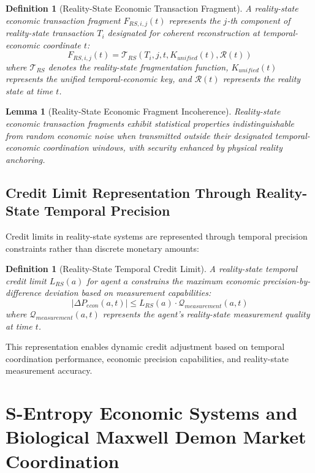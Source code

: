 \documentclass[12pt,a4paper]{article}
\newtheorem{lemma}[theorem]{Lemma}
\newtheorem{definition}[theorem]{Definition}
\begin{document}
\begin{definition}[Reality-State Economic Transaction Fragment]
A reality-state economic transaction fragment $F_{RS,i,j}(t)$ represents the $j$-th component of reality-state transaction $T_i$ designated for coherent reconstruction at temporal-economic coordinate $t$:
\begin{equation}
F_{RS,i,j}(t) = \mathcal{T}_{RS}(T_i, j, t, K_{unified}(t), \mathcal{R}(t))
\end{equation}
where $\mathcal{T}_{RS}$ denotes the reality-state fragmentation function, $K_{unified}(t)$ represents the unified temporal-economic key, and $\mathcal{R}(t)$ represents the reality state at time $t$.
\end{definition}

\begin{lemma}[Reality-State Economic Fragment Incoherence]
Reality-state economic transaction fragments exhibit statistical properties indistinguishable from random economic noise when transmitted outside their designated temporal-economic coordination windows, with security enhanced by physical reality anchoring.
\end{lemma}

\subsection{Credit Limit Representation Through Reality-State Temporal Precision}

Credit limits in reality-state systems are represented through temporal precision constraints rather than discrete monetary amounts:

\begin{definition}[Reality-State Temporal Credit Limit]
A reality-state temporal credit limit $L_{RS}(a)$ for agent $a$ constrains the maximum economic precision-by-difference deviation based on measurement capabilities:
\begin{equation}
|\Delta P_{econ}(a,t)| \leq L_{RS}(a) \cdot \mathcal{Q}_{measurement}(a,t)
\end{equation}
where $\mathcal{Q}_{measurement}(a,t)$ represents the agent's reality-state measurement quality at time $t$.
\end{definition}

This representation enables dynamic credit adjustment based on temporal coordination performance, economic precision capabilities, and reality-state measurement accuracy.

\section{S-Entropy Economic Systems and Biological Maxwell Demon Market Coordination}
\end{document}
